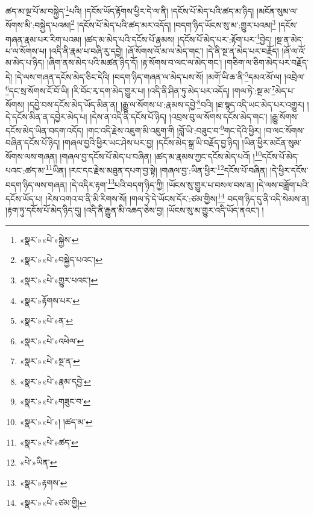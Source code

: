 ཚད་མ་ལྔ་པོ་མ་བསྐྱེད་\footnote{«སྣར་»«པེ་»སྐྱེས་}པའི། །དངོས་ཡོད་རྟོགས་ཕྱིར་དེ་ལ་ནི། །དངོས་པོ་མེད་པའི་ཚད་མ་ཉིད། །མངོན་སུམ་ལ་སོགས་མི་:བསྐྱེད་པའམ།\footnote{«སྣར་»«པེ་»བསྐྱེད་པའང་།} །དངོས་པོ་མེད་པའི་ཚད་མར་འདོད། །བདག་ཉིད་ཡོངས་སུ་མ་:གྱུར་པའམ།\footnote{«སྣར་»«པེ་»གྱུར་པའང་།} །དངོས་གཞན་རྣམ་པར་རིག་པའམ། །ཚད་མ་མེད་པའི་དངོས་པོ་རྣམས། །དངོས་པོ་མེད་པར་:རྟོག་པར་\footnote{«སྣར་»རྟོགས་པར་}བྱེད། །སྔ་ན་མེད་པ་ལ་སོགས་པ། །འདི་ནི་རྣམ་པ་བཞི་རུ་དབྱེ། །ཞོ་སོགས་འོ་མ་ལ་མེད་གང་། །དེ་ནི་སྔ་ན་མེད་པར་བརྗོད། །ཞོ་ལ་འོ་མ་མེད་པ་ཉིད། །ཞིག་ནས་མེད་པའི་མཚན་ཉིད་དོ། །རྟ་སོགས་བ་ལང་ལ་མེད་གང་། །གཅིག་ལ་ཅིག་མེད་པར་བརྗོད་དེ། །དེ་ལས་གཞན་དངོས་མེད་ཅིང་དེའི། །བདག་ཉིད་གཞན་ལ་མེད་པས་སོ། །མགོ་ཡི་ཆ་ནི་\footnote{«སྣར་»«པེ་»ན་}དམའ་མོ་ལ། །འབྲེལ་\footnote{«སྣར་»«པེ་»འཕེལ་}དང་སྲ་སོགས་ངོ་བོ་ཡི། །རི་བོང་རྭ་དག་མེད་གྱུར་པ། །འདི་ནི་ཤིན་ཏུ་མེད་པར་འདོད། །གལ་ཏེ་:སྔ་མ་\footnote{«སྣར་»«པེ་»སྔ་ན་}མེད་པ་སོགས། །དབྱེ་བས་དངོས་མེད་ཡོད་མིན་ན། །རྒྱུ་ལ་སོགས་པ་:རྣམས་དབྱེ་\footnote{«སྣར་»«པེ་»རྣམ་དབྱེ་}བའི། །ཐ་སྙད་འདི་ཡང་མེད་པར་འགྱུར། །དེ་དངོས་མིན་ན་དབྱེར་མེད་པ། །དེས་ན་འདི་ནི་དངོས་པོ་ཉིད། །འབྲས་བུ་ལ་སོགས་དངོས་མེད་གང་། །རྒྱུ་སོགས་དངོས་མེད་ཡིན་བདག་འདོད། །གང་འདི་རྗེས་འཇུག་མི་འཇུག་གི །བློ་ཡི་:བཟུང་བ་\footnote{«སྣར་»«པེ་»གཟུང་བ་}གང་དེའི་ཕྱིར། །བ་ལང་སོགས་བཞིན་དངོས་པོ་ཉིད། །གཞལ་བྱའི་ཕྱིར་ཡང་ཤེས་པར་བྱ། །དངོས་མེད་སྒྲ་ཡི་བརྗོད་བྱ་ཉིད། །ཡིན་ཕྱིར་མངོན་སུམ་སོགས་ལས་གཞན། །གཞལ་བྱ་དངོས་པོ་མེད་པ་བཞིན། །ཚད་མ་རྣམས་ཀྱང་དངོས་མེད་པའོ། །\footnote{«སྣར་»«པེ་»། །ཚད་མ་}དངོས་པོ་མེད་པའང་:ཚད་མ་\footnote{«སྣར་»«པེ་»ཚད་}ཡིན། །རང་དང་རྗེས་མཐུན་དཔག་བྱ་སྟེ། །གཞལ་བྱ་:ཡིན་ཕྱིར་\footnote{«པེ་»ཡིན་}དངོས་པོ་བཞིན། །དེ་ཕྱིར་དངོས་བདག་ཉིད་ལས་གཞན། །དེ་འདིར་རྟག་\footnote{«སྣར་»རྟགས་}པའི་བདག་ཉིད་ཀྱི། །ཡོངས་སུ་གྱུར་པ་བསལ་བས་ན། །དེ་ལས་བཟློག་པའི་དངོས་ཡོད་པ། །རེས་འགའ་བ་ནི་མི་རིགས་སོ། །གལ་ཏེ་དེ་ཡོངས་དོར་:ཙམ་གྱིས།\footnote{«སྣར་»«པེ་»ཙམ་གྱི།} བདག་ཉིད་དུ་ནི་འདི་སེམས་ན། །རྟག་ཏུ་དངོས་པོ་མེད་ཉིད་དུ། །འདི་ནི་རྒྱུན་མི་འཆད་ཅེས་བྱ། །ཡོངས་སུ་མ་གྱུར་འདི་ཡོད་ནའང་། །
